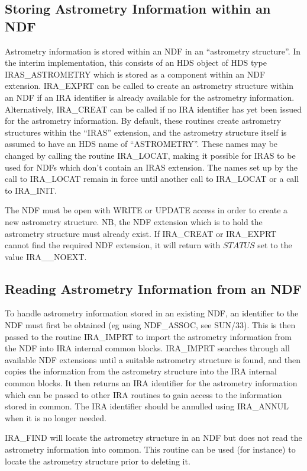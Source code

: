 \subsection {Storing Astrometry Information within an NDF}
Astrometry information is stored within an NDF in an ``astrometry structure''.
In the interim implementation, this consists of an HDS object of HDS type
IRAS\_ASTROMETRY which is stored as a component within an NDF extension.
IRA\_EXPRT can be called to create an astrometry structure within an NDF if an
IRA identifier is already available for the astrometry information.
Alternatively, IRA\_CREAT can be called if no IRA identifier has yet been issued
for the astrometry information. By default, these routines create astrometry
structures within the ``IRAS'' extension, and the astrometry structure itself is
assumed to have an HDS name of ``ASTROMETRY''. These names may be changed by
calling the routine IRA\_LOCAT, making it possible for IRAS to be used for NDFs
which don't contain an IRAS extension. The names set up by the call to
IRA\_LOCAT remain in force until another call to IRA\_LOCAT or a call to
IRA\_INIT.

The NDF must be open with WRITE or UPDATE access in order to create a new
astrometry structure. NB, the NDF extension which is to hold the astrometry
structure must already exist. If IRA\_CREAT or IRA\_EXPRT cannot find the
required NDF extension, it will return with $STATUS$ set to the value
IRA\_\_NOEXT.

\subsection {Reading Astrometry Information from an NDF}
To handle astrometry information stored in an existing NDF, an identifier to the
NDF must first be obtained (eg using NDF\_ASSOC, see SUN/33). This is then
passed to the routine IRA\_IMPRT to import the astrometry information from the
NDF into IRA internal common blocks. IRA\_IMPRT searches through all available
NDF extensions until a suitable astrometry structure is found, and then copies
the information from the astrometry structure into the IRA internal common
blocks. It then returns an IRA identifier for the astrometry information which
can be passed to other IRA routines to gain access to the information stored in
common. The IRA identifier should be annulled using IRA\_ANNUL when it is no
longer needed.

IRA\_FIND will locate the astrometry structure in an NDF but does not read the
astrometry information into common. This routine can be used (for instance) to
locate the astrometry structure prior to deleting it.

